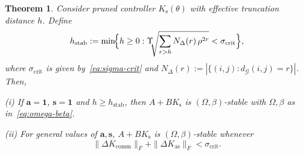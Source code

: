 \documentclass[letterpaper, 10pt, conference]{ieeeconf}
\newtheorem{theorem}{Theorem}
\begin{document}
\begin{theorem}
\label{thm:stab-trunc}
Consider pruned controller $K_{\mathrm{s}}(\theta)$ with effective truncation distance $h$.
Define
\begin{equation}\label{eq:h_stab}
  h_{\mathrm{stab}} := \min\!\Bigl\{h\geq 0 :
    \Upsilon\!\!
    \sqrt{\sum_{r>h} N_{\Delta}(r)\,
      \rho^{2r}}
    < \sigma_{\mathrm{crit}}\Bigr\},
\end{equation}
where $\sigma_{\mathrm{crit}}$ is
given by~\eqref{eq:sigma-crit}
and $N_{\Delta}(r)
  :=|\{(i,j):d_{\mathcal{G}}(i,j)=r\}|$. Then, 

\emph{(i)} If $\mathbf{a}=\mathbf{1}$,
$\mathbf{s}=\mathbf{1}$ and $h\geq h_{\mathrm{stab}}$,
then $A+BK_{\mathrm{s}}$ is
$(\Omega,\beta)$-stable with
$\Omega,\beta$ as
in~\eqref{eq:omega-beta}.

\emph{(ii)} For general values of $\mathbf{a}, \mathbf{s}$,
$A+BK_{\mathrm{s}}$ is
$(\Omega,\beta)$-stable whenever
\begin{equation}\label{eq:stab-general}
  \|\Delta K_{\mathrm{comm}}\|_F
  + \|\Delta K_{\mathrm{as}}\|_F
  < \sigma_{\mathrm{crit}}.
\end{equation}

\end{theorem}
\end{document}
